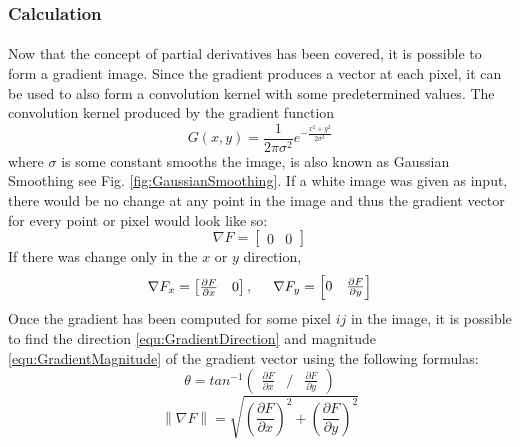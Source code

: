 \documentclass[11pt]{article}
\newcommand{\norm}[1]{\left\lVert#1\right\rVert}
\newcommand\simpleparagraph[1]{%
	\stepcounter{paragraph}\paragraph*{\theparagraph\quad{}#1}}
\renewcommand\theparagraph{}
\begin{document}
\subsubsection{Calculation}
\simpleparagraph{}
Now that the concept of partial derivatives has been covered, it is possible to form a gradient image. Since the gradient produces a vector at each pixel, it can be used to also form a convolution kernel with some predetermined values. The convolution kernel produced by the gradient function
{\small 
	\begin{equation}\label{equ:GaussianSmoothing}
	G(x,y)=\frac{1}{2\pi \sigma^{2}}e^{-\frac{x^{2}+y^{2}}{2\sigma^{2}}}
	\end{equation}
}
where $\sigma$ is some constant smooths the image, is also known as Gaussian Smoothing see Fig. \ref{fig:GaussianSmoothing}. If a white image was given as input, there would be no change at any point in the image and thus the gradient vector for every point or pixel would look like so:
{ \small
	\begin{equation}\label{equ:gradientFunctionBlank}
	\nabla F=
	\begin{bmatrix}
	0 & 0
	\end{bmatrix}
	\end{equation}
}
If there was change only in the $x$ or $y$ direction,
{ \small
	\begin{equation}\label{equ:gradientFunctionXorY}
	\nabla F_{x}=
	\begin{bmatrix}
		\frac{\partial F}{\partial x} & 0
	\end{bmatrix}
	,\hspace{.5cm}
	\nabla F_{y}=
	\begin{bmatrix}
		0 & \frac{\partial F}{\partial y}
	\end{bmatrix}
	\end{equation}
}
Once the gradient has been computed for some pixel $ij$ in the image, it is possible to find the direction \eqref{equ:GradientDirection} and magnitude \eqref{equ:GradientMagnitude} of the gradient vector using the following formulas:
{\small
	\begin{equation}\label{equ:GradientDirection}
		\theta = tan^{-1}
		\begin{pmatrix}
			\frac{\partial F}{\partial x} &/& \frac{\partial F}{\partial y}
		\end{pmatrix}
	\end{equation}
	\begin{equation}\label{equ:GradientMagnitude}
	\norm{\nabla F} = 
		\sqrt{(\frac{\partial F}{\partial x})^{2} + (\frac{\partial F}{\partial y})^{2}}
	\end{equation}
}
\end{document}
